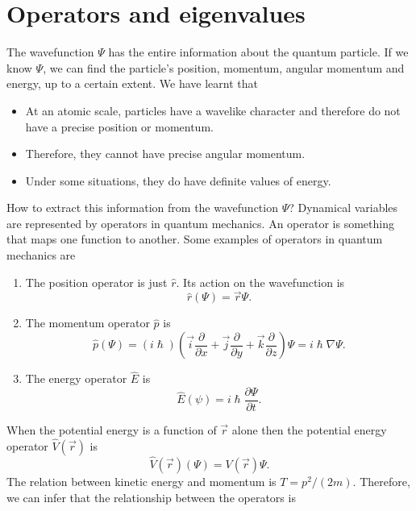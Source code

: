 \section{Operators and eigenvalues}\label{c4s3}
The wavefunction $\Psi$ has the entire information about the quantum particle.
If we know $\Psi$, we can find the particle's position, momentum, angular 
momentum and energy, up to a certain extent. We have learnt that 
\begin{itemize}
\item At an atomic scale, particles have a wavelike character and therefore
do not have a precise position or momentum.
\item Therefore, they cannot have precise angular momentum.
\item Under some situations, they do have definite values of energy.
\end{itemize}
How to extract this information from the wavefunction $\Psi$? Dynamical 
variables are represented by operators in quantum mechanics. An operator is
something that maps one function to another. Some examples of operators in
quantum mechanics are
\begin{enumerate}
\item The position operator is just $\hat{r}$. Its action on the wavefunction is
\begin{equation}\label{c4e3e1}
\hat{r}(\Psi) = \vec{r}\Psi.
\end{equation}
\item The momentum operator $\hat{p}$ is
\begin{equation}\label{c4s3e2}
\hat{p}(\Psi) = (i\hslash)\left(\vec{i}\frac{\partial}{\partial x} + 
\vec{j}\frac{\partial}{\partial y} + \vec{k}\frac{\partial}{\partial z}
\right)\Psi
= i\hslash\nabla\Psi.
\end{equation}
\item The energy operator $\hat{E}$ is
\begin{equation}\label{c4s3e3}
\hat{E}(\psi) = i\hslash\frac{\partial\Psi}{\partial t}.
\end{equation}
\end{enumerate}
When the potential energy is a function of $\vec{r}$ alone then the potential
energy operator $\hat{V}(\vec{r})$ is
\begin{equation}\label{c4s3e4}
\hat{V}(\vec{r})(\Psi) = V(\vec{r})\Psi.
\end{equation}
The relation between kinetic energy and momentum is $T = p^2/(2m)$. Therefore,
we can infer that the relationship between the operators is
